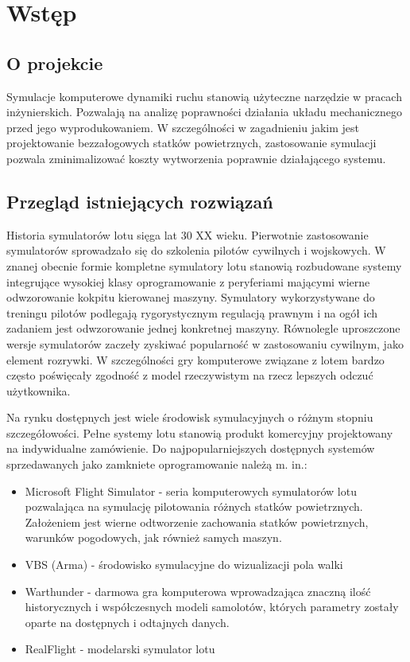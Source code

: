 \documentclass[15pt]{sprawozdanie}
\begin{document}
\newpage

\section{Wstęp}

\subsection{O projekcie}

Symulacje komputerowe dynamiki ruchu stanowią użyteczne narzędzie w pracach inżynierskich. Pozwalają na analizę poprawności działania układu mechanicznego przed jego wyprodukowaniem. W szczególności w zagadnieniu jakim jest projektowanie bezzałogowych statków powietrznych, zastosowanie symulacji pozwala zminimalizować koszty wytworzenia poprawnie działającego systemu.

\subsection{Przegląd istniejących rozwiązań}

Historia symulatorów lotu sięga lat 30 XX wieku. Pierwotnie zastosowanie symulatorów sprowadzało się do szkolenia pilotów cywilnych i wojskowych. W znanej obecnie formie kompletne symulatory lotu stanowią rozbudowane systemy integrujące wysokiej klasy oprogramowanie z peryferiami mającymi wierne odwzorowanie kokpitu kierowanej maszyny. Symulatory wykorzystywane do treningu pilotów podlegają rygorystycznym regulacją prawnym i na ogół ich zadaniem jest odwzorowanie jednej konkretnej maszyny. Równolegle uproszczone wersje symulatorów zaczeły zyskiwać popularność w zastosowaniu cywilnym, jako element rozrywki. W szczególności gry komputerowe związane z lotem bardzo często poświęcały zgodność z model rzeczywistym na rzecz lepszych odczuć użytkownika.

Na rynku dostępnych jest wiele środowisk symulacyjnych o różnym stopniu szczegółowości. Pełne systemy lotu stanowią produkt komercyjny projektowany na indywidualne zamówienie. Do najpopularniejszych dostępnych systemów sprzedawanych jako zamkniete oprogramowanie należą m. in.:

\begin{itemize}
\item Microsoft Flight Simulator -  seria komputerowych symulatorów lotu pozwalająca na symulację pilotowania różnych statków powietrznych. Założeniem jest wierne odtworzenie zachowania statków powietrznych, warunków pogodowych, jak również samych maszyn.
\item VBS (Arma) - środowisko symulacyjne do wizualizacji pola walki
\item Warthunder - darmowa gra komputerowa wprowadzająca znaczną ilość historycznych i współczesnych modeli samolotów, których parametry zostały oparte na dostępnych i odtajnych danych.
\item RealFlight - modelarski symulator lotu
\end{itemize}
\end{document}
